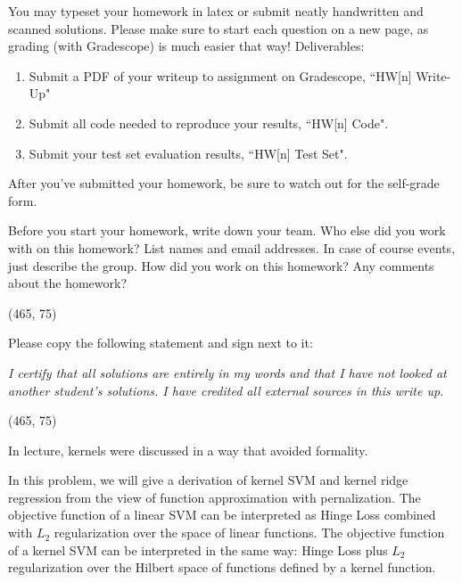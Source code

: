 
You may typeset your homework in latex or submit neatly handwritten and scanned solutions. Please make sure to start each question on a new page, as grading (with Gradescope) is much easier that way! Deliverables:

\begin{enumerate}
  \item Submit a PDF of your writeup to assignment on Gradescope, ``HW[n] Write-Up"
  \item Submit all code needed to reproduce your results, ``HW[n] Code".
  \item Submit your test set evaluation results, ``HW[n] Test Set".
\end{enumerate}

After you've submitted your homework, be sure to watch out for the self-grade form.

\begin{Parts}

\Part Before you start your homework, write down your team. Who else did you work with on this homework? List names and email addresses. In case of course events, just describe the group. How did you work on this homework? Any comments about the homework?

\vspace{15pt}
\framebox(465, 75){}

\Part Please copy the following statement and sign next to it:

\textit{I certify that all solutions are entirely in my words and that I have not looked at another student's solutions. I have credited all external sources in this write up.}

\vspace{15pt}
\framebox(465, 75){}

\end{Parts}

\pagebreak


In lecture, kernels were discussed in a way that avoided formality. 

In this problem, we will give a derivation of kernel SVM and kernel
ridge regression from the view of function approximation with
pernalization. The objective function of a linear SVM can be
interpreted as Hinge Loss combined with $L_2$ regularization over the
space of linear functions. The objective function of a kernel SVM can
be interpreted in the same way: Hinge Loss plus $L_2$ regularization
over the Hilbert space of functions defined by a kernel function. 


